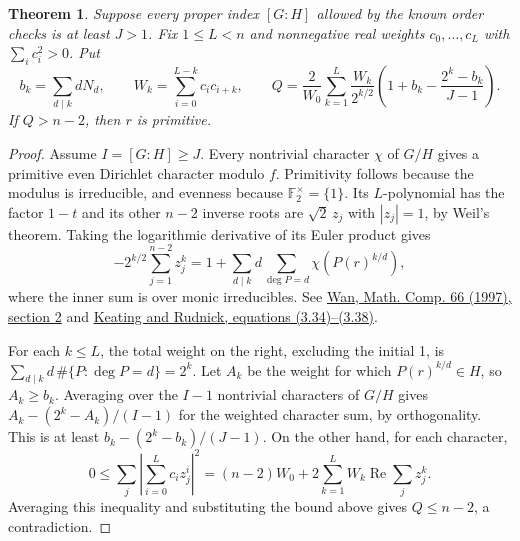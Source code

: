 \documentclass[11pt]{article}
\newtheorem{theorem}{Theorem}
\newcommand{\F}{\mathbb F_2}
\begin{document}
\begin{theorem}\label{thm:factor-moments}
Suppose every proper index \([G:H]\) allowed by the known order
checks is at least \(J>1\). Fix \(1\le L<n\) and nonnegative real
weights \(c_0,\ldots,c_L\) with \(\sum_i c_i^2>0\). Put
\[
 b_k=\sum_{d\mid k}dN_d,\qquad
 W_k=\sum_{i=0}^{L-k}c_i c_{i+k},\qquad
 Q=\frac{2}{W_0}\sum_{k=1}^L\frac{W_k}{2^{k/2}}
           \left(1+b_k-\frac{2^k-b_k}{J-1}\right).
\]
If \(Q>n-2\), then \(r\) is primitive.
\end{theorem}
\begin{proof}
Assume \(I=[G:H]\ge J\). Every nontrivial character \(\chi\) of
\(G/H\) gives a primitive even Dirichlet character modulo \(f\).
Primitivity follows because the modulus is irreducible, and evenness
because \(\F^\times=\{1\}\). Its \(L\)-polynomial has the factor
\(1-t\) and its other \(n-2\) inverse roots are
\(\sqrt2\,z_j\) with \(|z_j|=1\), by Weil's theorem.
Taking the logarithmic derivative of its Euler product gives
\[
 -2^{k/2}\sum_{j=1}^{n-2}z_j^k=1+
       \sum_{d\mid k}d\sum_{\deg P=d}\chi(P(r)^{k/d}),
\]
where the inner sum is over monic irreducibles. See
\href{https://doi.org/10.1090/S0025-5718-97-00835-1}{Wan, Math. Comp. 66 (1997), section 2}
and \href{https://www.math.tau.ac.il/~rudnick/papers/KeatingRudnickIMRNfinal.pdf}{Keating and Rudnick, equations (3.34)--(3.38)}.

For each \(k\le L\), the total weight on the right, excluding the
initial 1, is \(\sum_{d\mid k}d\,{\#}\{P:\deg P=d\}=2^k\).
Let \(A_k\) be the weight for which \(P(r)^{k/d}\in H\), so
\(A_k\ge b_k\). Averaging over the \(I-1\) nontrivial characters of
\(G/H\) gives \(A_k-(2^k-A_k)/(I-1)\) for the weighted character
sum, by orthogonality. This is at least
\(b_k-(2^k-b_k)/(J-1)\). On the other hand, for each character,
\[
  0\le \sum_j\left|\sum_{i=0}^L c_i z_j^i\right|^2
    =(n-2)W_0+2\sum_{k=1}^L W_k\operatorname{Re}\sum_j z_j^k .
\]
Averaging this inequality and substituting the bound above gives
\(Q\le n-2\), a contradiction.
\end{proof}
\end{document}
